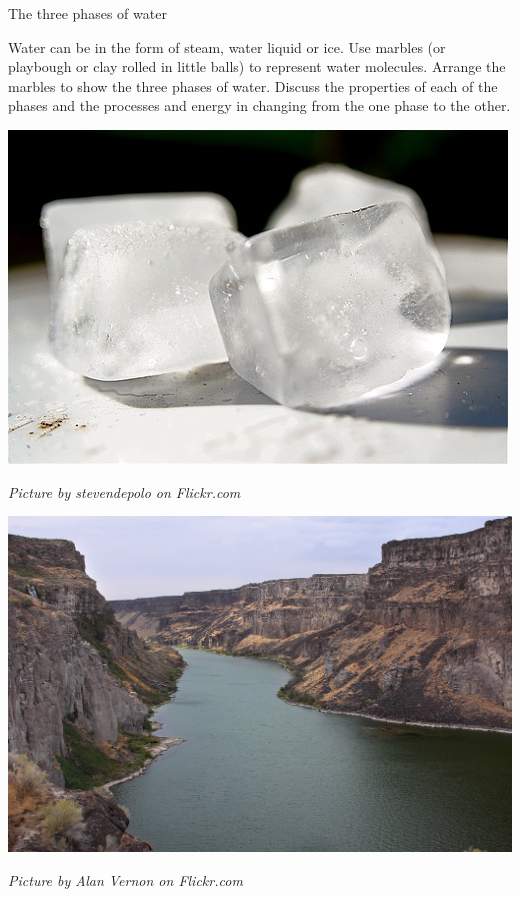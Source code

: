 \begin{activity}{The three phases of water}
\begin{minipage}{0.5\textwidth}
Water can be in the form of steam, water liquid or ice. Use marbles (or playbough or clay rolled in little balls) to represent water molecules. Arrange the marbles to show the three phases of water. Discuss the properties of each of the phases and the processes and energy in changing from the one phase to the other. 
\end{minipage}
\begin{minipage}{.5\textwidth}
\begin{center}
 \includegraphics[width=.3\textwidth]{photos/iceby-stevendepolo-flickr.jpg}\par
\textit{Picture by stevendepolo on Flickr.com}
\end{center}
\begin{center}
 \includegraphics[width=.3\textwidth]{photos/AlanVernon.jpg}\par
\textit{Picture by Alan Vernon on Flickr.com}
\end{center}
\end{minipage}
\end{activity}

      
\label{m38730*cid7}

